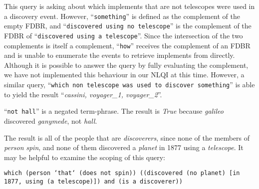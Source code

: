 \documentclass[../main.tex]{subfiles}
\begin{document}
\begin{refsection}
\examplespacing


\examplespacing

\noindent This query is asking about which implements that are not telescopes were used in a discovery event.  However, ``\texttt{something}'' is defined as the complement of the empty FDBR, and ``\texttt{discovered using no telescope}'' is the complement of the FDBR of ``\texttt{discovered using a telescope}''.  Since the intersection of the two complements is itself a complement, ``\texttt{how}'' receives the complement of an FDBR and is unable to enumerate the events to retrieve implements from directly.  Although it is possible to answer the query by fully evaluating the complement, we have not implemented this behaviour in our NLQI at this time.  However, a similar query, ``\texttt{which non telescope was used to discover something}'' is able to yield the result ``\textit{cassini, voyager\_1, voyager\_2}''.



\examplespacing


\examplespacing

\noindent ``\texttt{not hall}'' is a negated term-phrase.  The result is \textit{True} because \textit{galileo} discovered \textit{ganymede}, not \textit{hall}.

\examplespacing


\examplespacing

\noindent The result is all of the people that are \textit{discoverers}, since none of the members of \textit{person} \textit{spin}, and none of them discovered a \textit{planet} in 1877 using a \textit{telescope}.  It may be helpful to examine the scoping of this query:
\begin{center}
\texttt{which (person `that` (does not spin)) ((discovered (no planet) [in 1877, using (a telescope)]) and (is a discoverer))}
\end{center}


\end{refsection}
\end{document}

